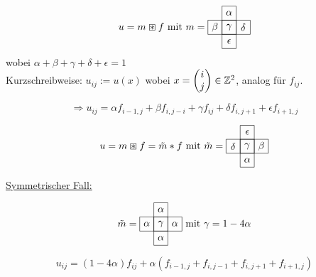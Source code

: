 			\begin{equation*}
				u = m \boxast f \text{ mit } m= \raisebox{-0.665cm}{\begin{tikzpicture}
					\draw[step = 0.5] (0,0) grid (0.5,1.5);
					\draw[step = 0.5] (-0.5,1) grid (1,0.5);
					\draw (0.25,1.25) node {$\alpha$};
					\draw (0.25,0.75) node {$\gamma$};
					\draw (0.25,0.25) node {$\epsilon$};
					\draw (-0.25,0.75) node {$\beta$};
					\draw (0.75,0.75) node {$\delta$};
				\end{tikzpicture}}
			\end{equation*}
			wobei $\alpha + \beta +\gamma +\delta + \epsilon = 1$\\
			Kurzschreibweise: $u_{ij}:=u(x)$ wobei $x = \begin{pmatrix}i\\j\end{pmatrix} \in \mathbb{Z}^2$, analog für $f_{ij}$.
		
			\[\Rightarrow u_{ij} = \alpha f_{i-1,j} + \beta f_{i,j-i} + \gamma f_{ij} + \delta f_{i,j+1} + \epsilon f_{i+1,j}\]
		
			\begin{equation*}
				u = m \boxast f = \tilde m * f \text{ mit } \tilde m = \raisebox{-0.665cm}{\begin{tikzpicture}
					\draw[step = 0.5] (0,0) grid (0.5,1.5);
					\draw[step = 0.5] (-0.5,1) grid (1,0.5);
					\draw (0.25,1.25) node {$\epsilon$};
					\draw (0.25,0.75) node {$\gamma$};
					\draw (0.25,0.25) node {$\alpha$};
					\draw (-0.25,0.75) node {$\delta$};
					\draw (0.75,0.75) node {$\beta$};
				\end{tikzpicture}}
			\end{equation*}
		
			\underline{Symmetrischer Fall:}
		
			\begin{equation*}
			\tilde m = \raisebox{-0.665cm}{\begin{tikzpicture}
					\draw[step = 0.5] (0,0) grid (0.5,1.5);
					\draw[step = 0.5] (-0.5,1) grid (1,0.5);
					\draw (0.25,1.25) node {$\alpha$};
					\draw (0.25,0.75) node {$\gamma$};
					\draw (0.25,0.25) node {$\alpha$};
					\draw (-0.25,0.75) node {$\alpha$};
					\draw (0.75,0.75) node {$\alpha$};
				\end{tikzpicture}} \text{ mit } \gamma = 1 - 4 \alpha
			\end{equation*}
		
			\begin{equation}
				u_{ij} = (1 - 4 \alpha)f_{ij} + \alpha(f_{i-1,j} + f_{i,j-1} + f_{i,j+1} + f_{i+1,j})
			\end{equation}
		
